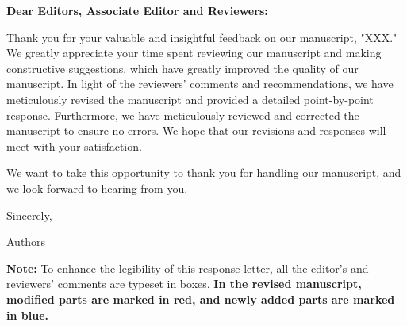 \thispagestyle{empty}
\clearpage
{}
{}

\noindent \textbf{Dear Editors, Associate Editor and Reviewers:}

Thank you for your valuable and insightful feedback on our manuscript, "XXX." We greatly appreciate your time spent reviewing our manuscript and making constructive suggestions, which have greatly improved the quality of our manuscript. In light of the reviewers' comments and recommendations, we have meticulously revised the manuscript and provided a detailed point-by-point response. Furthermore, we have meticulously reviewed and corrected the manuscript to ensure no errors. We hope that our revisions and responses will meet with your satisfaction.

We want to take this opportunity to thank you for handling our manuscript, and we look forward to hearing from you.

\vspace{8em}

\noindent Sincerely,

\noindent Authors

\vfill
\textbf{Note:} To enhance the legibility of this response letter, all the editor's and reviewers' comments are typeset in boxes. \textbf{In the revised manuscript, modified parts are marked in red, and newly added parts are marked in blue.}